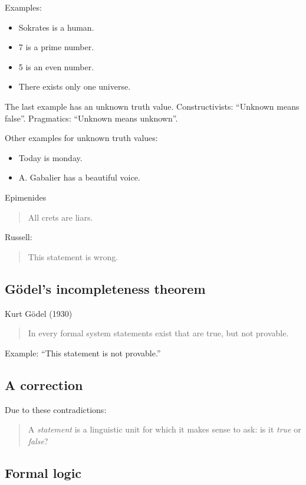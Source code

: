 \documentclass[a4paper,landscape,twocolumn]{article}
\begin{document}
Examples:
\begin{itemize}
  \item Sokrates is a human.
  \item 7 is a prime number.
  \item 5 is an even number.
  \item There exists only one universe.
\end{itemize}

The last example has an unknown truth value.
Constructivists: \enquote{Unknown means false}.
Pragmatics: \enquote{Unknown means unknown}.

Other examples for unknown truth values:
\begin{itemize}
  \item Today is monday.
  \item A. Gabalier has a beautiful voice.
\end{itemize}

Epimenides
\begin{quote}
  All crets are liars.
\end{quote}

Russell:
\begin{quote}
  This statement is wrong.
\end{quote}

\subsection{Gödel's incompleteness theorem}

Kurt Gödel (1930)
\begin{quote}
  In every formal system statements exist that
  are true, but not provable.
\end{quote}

Example: \enquote{This statement is not provable.}

\subsection{A correction}

Due to these contradictions:
\begin{quote}
  A \emph{statement} is a linguistic unit for which it makes sense to ask:
  is it \emph{true} or \emph{false}?
\end{quote}

\subsection{Formal logic}
\end{document}
